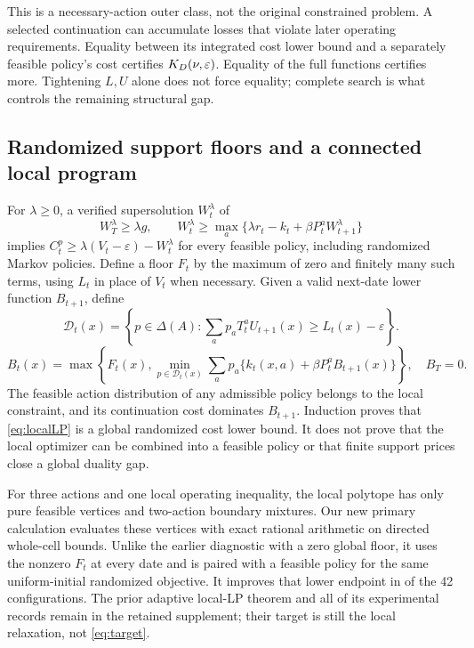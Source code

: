 This is a necessary-action outer class, not the original constrained problem. A selected continuation can accumulate losses that violate later operating requirements. Equality between its integrated cost lower bound and a separately feasible policy's cost certifies $K_D(\nu,\varepsilon)$. Equality of the full functions certifies more. Tightening $L,U$ alone does not force equality; complete search is what controls the remaining structural gap.

\subsection{Randomized support floors and a connected local program}\label{sec:local}
For $\lambda\geq0$, a verified supersolution $W_t^\lambda$ of
\[
 W_T^\lambda\geq\lambda g,\qquad
 W_t^\lambda\geq\max_a\{\lambda r_t-k_t+\beta P_t^aW_{t+1}^\lambda\}
\]
implies $C_t^p\geq\lambda(V_t-\varepsilon)-W_t^\lambda$ for every feasible policy, including randomized Markov policies. Define a floor $F_t$ by the maximum of zero and finitely many such terms, using $L_t$ in place of $V_t$ when necessary. Given a valid next-date lower function $B_{t+1}$, define
\[
 \mathcal D_t(x)=\left\{p\in\Delta(A):\sum_ap_aT_t^aU_{t+1}(x)\geq L_t(x)-\varepsilon\right\}.
\]
\begin{equation}\label{eq:localLP}
 B_t(x)=\max\left\{F_t(x),\min_{p\in\mathcal D_t(x)}
 \sum_ap_a\{k_t(x,a)+\beta P_t^aB_{t+1}(x)\}\right\},\quad B_T=0.
\end{equation}
The feasible action distribution of any admissible policy belongs to the local constraint, and its continuation cost dominates $B_{t+1}$. Induction proves that \eqref{eq:localLP} is a global randomized cost lower bound. It does not prove that the local optimizer can be combined into a feasible policy or that finite support prices close a global duality gap.

For three actions and one local operating inequality, the local polytope has only pure feasible vertices and two-action boundary mixtures. Our new primary calculation evaluates these vertices with exact rational arithmetic on directed whole-cell bounds. Unlike the earlier diagnostic with a zero global floor, it uses the nonzero $F_t$ at every date and is paired with a feasible policy for the same uniform-initial randomized objective. It improves that lower endpoint in \LocalImproveCount{} of the 42 configurations. The prior adaptive local-LP theorem and all of its experimental records remain in the retained supplement; their target is still the local relaxation, not \eqref{eq:target}.


